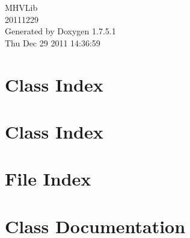 \documentclass[a4paper]{book}
\begin{document}
\hypersetup{pageanchor=false,citecolor=blue}
\begin{titlepage}
\vspace*{7cm}
\begin{center}
{\Large \-M\-H\-V\-Lib \\[1ex]\large 20111229 }\\
\vspace*{1cm}
{\large \-Generated by Doxygen 1.7.5.1}\\
\vspace*{0.5cm}
{\small Thu Dec 29 2011 14:36:59}\\
\end{center}
\end{titlepage}
\clearemptydoublepage
{}
\tableofcontents
\clearemptydoublepage
{}
\hypersetup{pageanchor=true,citecolor=blue}
\chapter{\-Class \-Index}

\chapter{\-Class \-Index}

\chapter{\-File \-Index}

\chapter{\-Class \-Documentation}













































\end{document}
